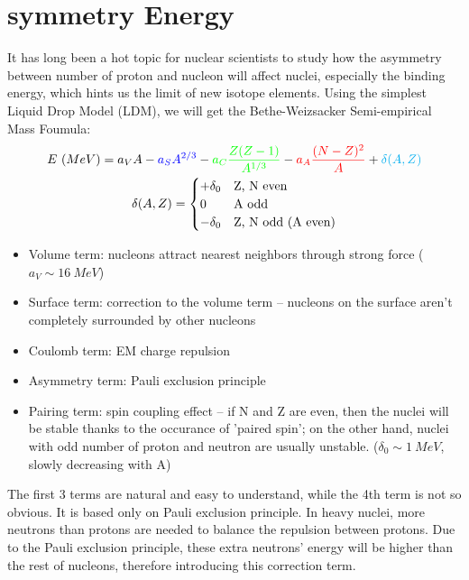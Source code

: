 \section{symmetry Energy} 
It has long been a hot topic for nuclear scientists to study how the asymmetry 
between number of proton and nucleon will affect nuclei, especially the binding
energy, which hints us the limit of new isotope elements. Using the simplest 
Liquid Drop Model (LDM), we will get the Bethe-Weizsacker Semi-empirical Mass Foumula:
\begin{equation}
    \label{eq:mass-foumula}
    \begin{gathered}
	E\ (MeV) = \textcolor{black}{a_V A} 
	    - \textcolor{blue}{a_S A^{2/3}} 
	    - \textcolor{green}{a_C\frac{Z(Z-1)}{A^{1/3}}} 
	    - \textcolor{red}{a_A\frac{(N-Z)^2}{A}} 
	    + \textcolor{cyan}{\delta(A, Z)} \\
	\delta(A, Z) = 
	    \begin{cases}
		+\delta_0	& \text{Z, N even} \\
		0		& \text{A odd}	\\
		-\delta_0	& \text{Z, N odd (A even)} \\
	    \end{cases}
    \end{gathered}
\end{equation}

\begin{itemize}
    \color{black} \item Volume term: nucleons attract nearest neighbors 
	through strong force ($a_V \sim 16\ MeV$)
    \color{blue}  \item Surface term: correction to the volume term -- nucleons 
	on the surface aren't completely surrounded by other nucleons
    \color{green} \item Coulomb term: EM charge repulsion
    \color{red}   \item Asymmetry term: Pauli exclusion principle
    \color{cyan}  \item Pairing term: spin coupling effect -- if N and Z are even,
	then the nuclei will be stable thanks to the occurance of 'paired spin';
	on the other hand, nuclei with odd number of proton and neutron are usually
	unstable. ($\delta_0 \sim 1\ MeV$, slowly decreasing with A)
\end{itemize}

The first 3 terms are natural and easy to understand, while the 4th term is 
not so obvious. It is based only on Pauli exclusion principle. In heavy nuclei,
more neutrons than protons are needed to balance the repulsion between protons.
Due to the Pauli exclusion principle, these extra neutrons' energy will be 
higher than the rest of nucleons, therefore introducing this correction term.

